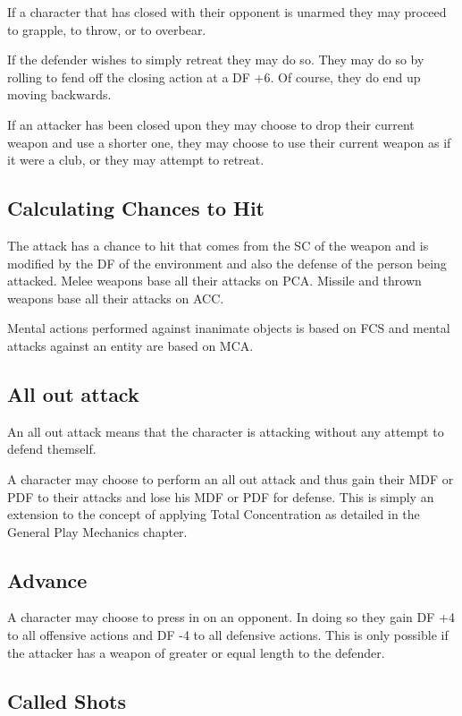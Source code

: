 If a character that has closed with their opponent is unarmed
they may proceed to grapple, to throw, or to overbear.

If the defender wishes to simply retreat they may do so. They
may do so by rolling to fend off the closing action at a DF +6.
Of course, they do end up moving backwards.

If an attacker has been closed upon they may choose to drop their
current weapon and use a shorter one, they may choose to use their
current weapon as if it were a club, or they may attempt to retreat.

\subsection{Calculating Chances to Hit}

The attack has a chance to hit that comes from the SC of the weapon and
is modified by the DF of the environment and also the defense of the
person being attacked. Melee
weapons base all their attacks on PCA. Missile and thrown weapons
base all their attacks on ACC.

Mental actions performed against inanimate objects is based on FCS
and mental attacks against an entity are based on MCA.

\subsection{All out attack}

An all out attack means that the character is attacking without any attempt to defend themself.

A character may choose to perform an all out attack and thus gain
their MDF or PDF to their attacks and lose his MDF or PDF for defense. This is simply an
extension to the concept of applying Total Concentration as detailed
in the General Play Mechanics chapter.

\subsection{Advance}


A character may choose to press in on an opponent. In doing so
they gain DF +4 to all offensive actions and DF -4 to all defensive
actions. This is only possible if the attacker has a weapon of greater
or equal length to the defender.

\subsection{Called Shots}

